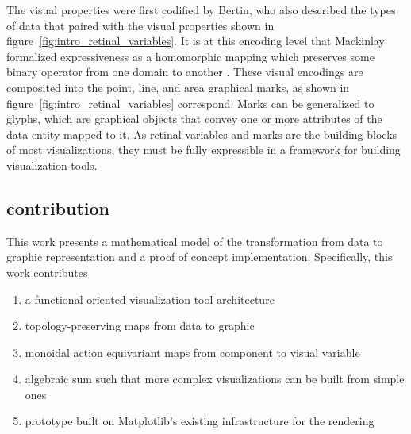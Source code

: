 \documentclass[../main.tex]{subfiles}
\begin{document}
The visual properties were first codified by Bertin\cite{bertinSemiologyGraphicsDiagrams2011a}, who also described the types of data that paired with the visual properties shown in figure~\ref{fig:intro_retinal_variables}. It is at this encoding level that Mackinlay formalized expressiveness as a homomorphic mapping which preserves some binary operator from one domain to another \cite{mackinlayAUTOMATICDESIGNGRAPHICAL1987}. These visual encodings are composited into the point, line, and area graphical marks, as shown in figure~\ref{fig:intro_retinal_variables} correspond. Marks can be generalized to glyphs, which are graphical objects that convey one or more attributes of the data entity mapped to it\cite{ware2019information, munznerVisualizationAnalysisDesign2014}. As retinal variables and marks are the building blocks of most visualizations, they must be fully expressible in a framework for building visualization tools.   

\subsection{contribution}
This work presents a mathematical model of the transformation from data to graphic representation and a proof of concept implementation. Specifically, this work contributes

\begin{enumerate}
    \item a functional oriented visualization tool architecture
    \item topology-preserving maps from data to graphic 
    \item monoidal action equivariant maps from component to visual variable 
    \item algebraic sum such that more complex visualizations can be built from simple ones 
    \item prototype built on Matplotlib's existing infrastructure for the rendering 
\end{enumerate}
\end{document}
